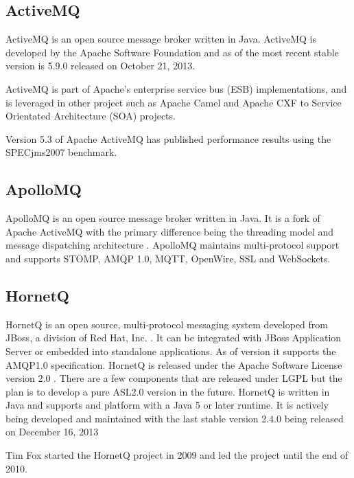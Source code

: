 \documentclass{thesis}
\begin{document}
\subsection{ActiveMQ}
ActiveMQ is an open source message broker written in Java.  ActiveMQ is developed by the Apache Software Foundation and as of  the most recent stable version is 5.9.0 released on October 21, 2013.

ActiveMQ is part of Apache's enterprise service bus (ESB) implementations, and is leveraged in other project such as Apache Camel and Apache CXF to Service Orientated Architecture (SOA) projects.

Version 5.3 of Apache ActiveMQ has published performance results using the SPECjms2007 benchmark.  


\subsection{ApolloMQ}
ApolloMQ is an open source message broker written in Java.  It is a fork of Apache ActiveMQ with the primary difference being the threading model and message dispatching architecture .  ApolloMQ maintains multi-protocol support and supports STOMP, AMQP 1.0, MQTT, OpenWire, SSL and WebSockets.



\subsection{HornetQ}
HornetQ is an open source, multi-protocol messaging system developed from JBoss, a division of Red Hat, Inc. \cite{http://en.wikipedia.org/wiki/JBoss_(company)}.  It can be integrated with JBoss Application Server or embedded into standalone applications.  As of version  it supports the AMQP1.0 specification.  HornetQ is released under the Apache Software License version 2.0 .  There are a few components that are released under LGPL  but the plan is to develop a pure ASL2.0 version in the future.  HornetQ is written in Java and supports and platform with a Java 5 or later runtime.   It is actively being developed and maintained with the last stable version 2.4.0 being released on December 16, 2013 


Tim Fox started the HornetQ project in 2009 and led the project until the end of 2010. 
\end{document}
